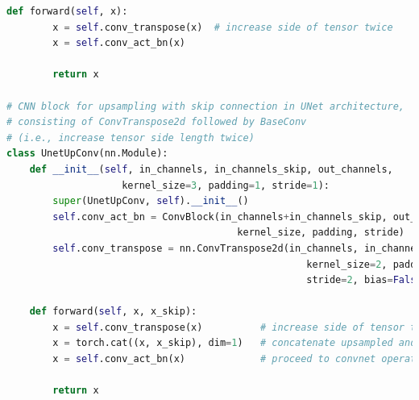 \documentclass[11pt]{article}
\begin{document}
\begin{lstlisting}[language=Python, basicstyle=\scriptsize]
    def forward(self, x):
        x = self.conv_transpose(x)  # increase side of tensor twice
        x = self.conv_act_bn(x)

        return x

# CNN block for upsampling with skip connection in UNet architecture, 
# consisting of ConvTranspose2d followed by BaseConv 
# (i.e., increase tensor side length twice)
class UnetUpConv(nn.Module):
    def __init__(self, in_channels, in_channels_skip, out_channels, 
                    kernel_size=3, padding=1, stride=1):
        super(UnetUpConv, self).__init__()
        self.conv_act_bn = ConvBlock(in_channels+in_channels_skip, out_channels, 
                                        kernel_size, padding, stride)
        self.conv_transpose = nn.ConvTranspose2d(in_channels, in_channels, 
                                                    kernel_size=2, padding=0, 
                                                    stride=2, bias=False)
        
    def forward(self, x, x_skip):
        x = self.conv_transpose(x)          # increase side of tensor twice
        x = torch.cat((x, x_skip), dim=1)   # concatenate upsampled and skipped tensor
        x = self.conv_act_bn(x)             # proceed to convnet operation

        return x
\end{lstlisting}
\end{document}
